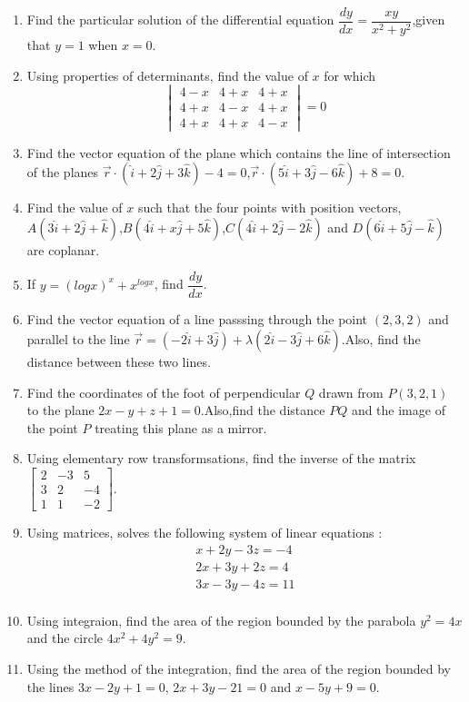 \documentclass[12pt,-letter paper]{article}
\providecommand{\myvec}[1]{\ensuremath{\begin{bmatrix}#1\end{bmatrix}}}
\providecommand{\brak}[1]{\ensuremath{\left(#1\right)}}
\begin{document}
{\begin{enumerate}
\item Find the particular solution of the differential equation $\dfrac{dy}{dx}=\dfrac{xy}{x^{2}+y^{2}}$,given that $y=1$ when $x=0$.
\item Using properties of determinants, find the value of $x$ for which
	\[\begin{vmatrix}
		4-x & 4+x & 4+x\\
		4+x & 4-x & 4+x\\
		4+x & 4+x & 4-x
	\end{vmatrix}=0\]
\item Find the vector equation of the plane which contains the line of intersection of the planes $\overrightarrow{r}\cdot(\hat{i}+2\hat{j}+3\hat{k})-4=0$,$\overrightarrow{r}\cdot(5\hat{i}+3\hat{j}-6\hat{k})+8=0$.
\item Find the value of $x$ such that the four points with position vectors,$A\brak{3\hat{i}+2\hat{j}+\hat{k}}$,$B\brak{4\hat{i}+x\hat{j}+5\hat{k}}$,$C\brak{4\hat{i}+2\hat{j}-2\hat{k}}$ and $D\brak{6\hat{i}+5\hat{j}-\hat{k}}$ are coplanar.
\item If $y=(logx)^{x} + x^{logx}$, find $\dfrac{dy}{dx}$.
\item Find the vector equation of a line passsing through the point $\brak{2,3,2}$ and parallel to the line $\overrightarrow{r} =\brak{-2\hat{i}+3\hat{j}}+\lambda{\brak{2\hat{i}-3\hat{j}+6\hat{k}}}$.Also, find the distance between these two lines.
\item Find the coordinates of the foot of perpendicular $Q$ drawn from $P\brak{3,2,1}$ to the plane $2x-y+z+1=0$.Also,find the distance $PQ$ and the image of the point $P$ treating this plane as a mirror.
\item Using elementary row transformsations, find the inverse of the matrix $\myvec{2 & -3 & 5 \\3 & 2 & -4 \\1 & 1 & -2}$.
\item Using matrices, solves the following system of linear equations :
	\begin{align*}
		{x+2y-3z}=-4\\
		{2x+3y+2z}=4\\
		{3x-3y-4z}=11\\
	\end{align*}
\item Using integraion, find the area of the region bounded by the parabola $y^{2}=4x$ and the circle $4x^{2}+4y^{2}=9$.
\item Using the method of the integration, find the area of the region bounded by the lines $3x-2y+1=0$, $2x+3y-21=0$ and $x-5y+9=0$.

\end{enumerate}}
\end{document}
